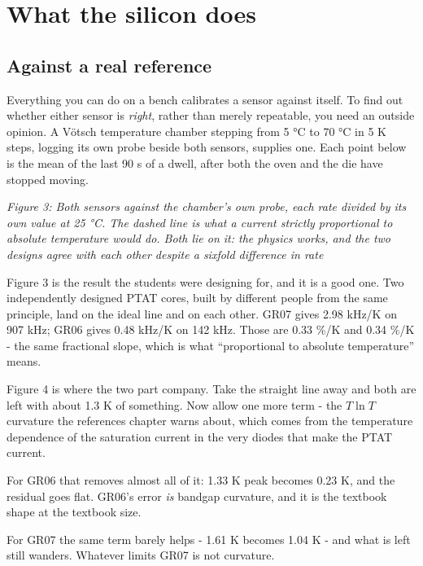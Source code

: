 \section{What the silicon does}\label{what-the-silicon-does}

\subsection{Against a real reference}\label{against-a-real-reference}

Everything you can do on a bench calibrates a sensor against itself. To
find out whether either sensor is \emph{right}, rather than merely
repeatable, you need an outside opinion. A Vötsch temperature chamber
stepping from 5 °C to 70 °C in 5 K steps, logging its own probe beside
both sensors, supplies one. Each point below is the mean of the last 90
s of a dwell, after both the oven and the die have stopped moving.


{
\centering
{}
}

\emph{Figure 3: Both sensors against the chamber's own probe, each rate
divided by its own value at 25 °C. The dashed line is what a current
strictly proportional to absolute temperature would do. Both lie on it:
the physics works, and the two designs agree with each other despite a
sixfold difference in rate}

Figure 3 is the result the students were designing for, and it is a good
one. Two independently designed PTAT cores, built by different people
from the same principle, land on the ideal line and on each other. GR07
gives 2.98 kHz/K on 907 kHz; GR06 gives 0.48 kHz/K on 142 kHz. Those are
0.33 \%/K and 0.34 \%/K - the same fractional slope, which is what
``proportional to absolute temperature'' means.

Figure 4 is where the two part company. Take the straight line away and
both are left with about 1.3 K of something. Now allow one more term -
the \(T\ln T\) curvature the references chapter warns about, which comes
from the temperature dependence of the saturation current in the very
diodes that make the PTAT current.

For GR06 that removes almost all of it: 1.33 K peak becomes 0.23 K, and
the residual goes flat. GR06's error \emph{is} bandgap curvature, and it
is the textbook shape at the textbook size.

For GR07 the same term barely helps - 1.61 K becomes 1.04 K - and what
is left still wanders. Whatever limits GR07 is not curvature.


